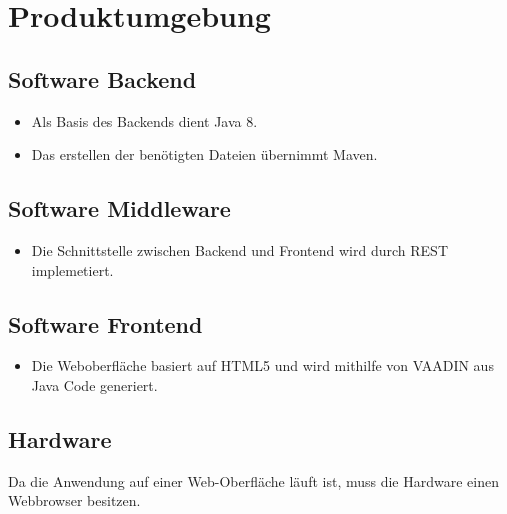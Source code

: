 \section{Produktumgebung}

\subsection{Software Backend}
\begin{itemize}
    \item Als Basis des Backends dient Java 8.
    \item Das erstellen der benötigten Dateien übernimmt Maven.
\end{itemize}

\subsection{Software Middleware}
\begin{itemize}
    \item Die Schnittstelle zwischen Backend und Frontend wird durch REST implemetiert.
\end{itemize}

\subsection{Software Frontend}
\begin{itemize}
    \item Die Weboberfläche basiert auf HTML5 und wird mithilfe von VAADIN aus Java Code generiert.
\end{itemize}

\subsection{Hardware}
    Da die Anwendung auf einer Web-Oberfläche läuft ist, muss die Hardware einen Webbrowser besitzen.

